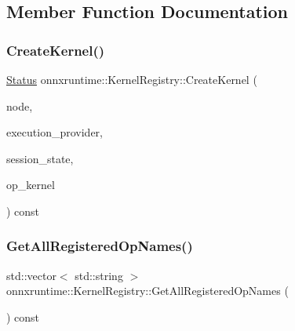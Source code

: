 \subsection{Member Function Documentation}
\mbox{\label{classonnxruntime_1_1KernelRegistry_a812ae91800b74bcbe37a682ab94f4477}} 
\subsubsection{\texorpdfstring{Create\+Kernel()}{CreateKernel()}}
{\footnotesize\ttfamily \mbox{\hyperlink{classonnxruntime_1_1common_1_1Status}{Status}} onnxruntime\+::\+Kernel\+Registry\+::\+Create\+Kernel (\begin{DoxyParamCaption}\item[{const \mbox{\hyperlink{classonnxruntime_1_1Node}{onnxruntime\+::\+Node}} \&}]{node,  }\item[{const \mbox{\hyperlink{classonnxruntime_1_1IExecutionProvider}{I\+Execution\+Provider}} \&}]{execution\+\_\+provider,  }\item[{const \mbox{\hyperlink{classonnxruntime_1_1SessionState}{Session\+State}} \&}]{session\+\_\+state,  }\item[{std\+::unique\+\_\+ptr$<$ \mbox{\hyperlink{classonnxruntime_1_1OpKernel}{Op\+Kernel}} $>$ \&}]{op\+\_\+kernel }\end{DoxyParamCaption}) const}

\mbox{\label{classonnxruntime_1_1KernelRegistry_a33e9c2ab5a8ed53cfca517b228d5d9fb}} 
\subsubsection{\texorpdfstring{Get\+All\+Registered\+Op\+Names()}{GetAllRegisteredOpNames()}}
{\footnotesize\ttfamily std\+::vector$<$ std\+::string $>$ onnxruntime\+::\+Kernel\+Registry\+::\+Get\+All\+Registered\+Op\+Names (\begin{DoxyParamCaption}{ }\end{DoxyParamCaption}) const}

